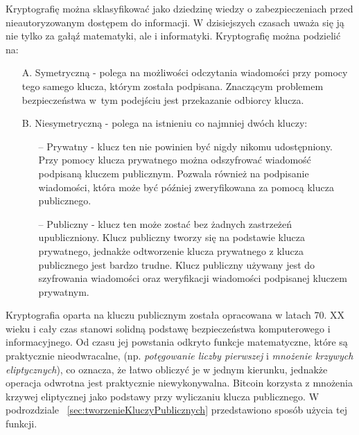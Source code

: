 \documentclass[12pt, twoside, final, openany]{mgr}
\begin{document}
\indent Kryptografię można sklasyfikować jako dziedzinę wiedzy o zabezpieczeniach przed nieautoryzowanym dostępem do informacji. W dzisiejszych czasach uważa się ją nie tylko za gałąź matematyki, ale i informatyki. Kryptografię można podzielić na:
\begin{itemize}
\item[A.] Symetryczną - polega na możliwości odczytania wiadomości przy pomocy tego samego klucza, którym została podpisana. Znaczącym problemem bezpieczeństwa w~tym podejściu jest przekazanie odbiorcy klucza. 
\item[B.] Niesymetryczną - polega na istnieniu co najmniej dwóch kluczy:
\begin{itemize}
\item[--] Prywatny - klucz ten nie powinien być nigdy nikomu udostępniony. Przy pomocy klucza prywatnego można odszyfrować wiadomość podpisaną kluczem publicznym. Pozwala również na podpisanie wiadomości, która może być później zweryfikowana za pomocą klucza publicznego.
\item[--] Publiczny - klucz ten może zostać bez żadnych zastrzeżeń upubliczniony. Klucz publiczny tworzy się na podstawie klucza prywatnego, jednakże odtworzenie klucza prywatnego z klucza publicznego jest bardzo trudne. Klucz publiczny używany jest do szyfrowania wiadomości oraz weryfikacji wiadomości podpisanej kluczem prywatnym.
\end{itemize}
\end{itemize} 

\indent Kryptografia oparta na kluczu publicznym została opracowana w latach 70. XX wieku i cały czas stanowi solidną podstawę bezpieczeństwa komputerowego i informacyjnego. Od czasu jej powstania odkryto funkcje matematyczne, które są praktycznie nieodwracalne, (np. \textit{potęgowanie liczby pierwszej} i \textit{mnożenie krzywych eliptycznych}), co oznacza, że łatwo obliczyć je w jednym kierunku, jednakże operacja odwrotna jest praktycznie niewykonywalna. Bitcoin korzysta z mnożenia krzywej eliptycznej jako podstawy przy wyliczaniu klucza publicznego. W podrozdziale ~\ref{sec:tworzenieKluczyPublicznych} przedstawiono sposób użycia tej funkcji.
\end{document}
